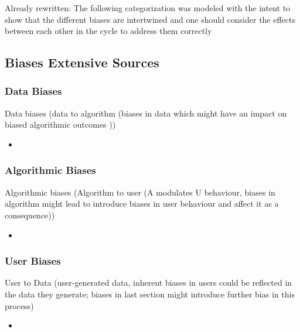 \documentclass[12pt, a4paper, oneside]{book}   	%
\renewcommand{\paragraph}[1]{%
	\subsubsection*{#1}%
}
\newif\ifrawcitationactive
\newcommand{\rawcitationstart}{
	\color{purple}\rawcitationactivetrue
}
\begin{document}
			Already rewritten: The following categorization was modeled with the intent to show that the different biases are intertwined and one should consider the effects between each other in the cycle to address them correctly \autocite{Mehrabi_2021}
		




			\rawcitationstart
			\subsection{Biases Extensive Sources}
			
			\paragraph{Data Biases}
			Data biases (data to algorithm (biases in data which might have an impact on biased algorithmic outcomes \autocite{Mehrabi_2021}))	
			\begin{itemize}
				\item 
			\end{itemize}	
			
			
			\paragraph{Algorithmic Biases}
			
			Algorithmic biases (Algorithm to user (A modulates U behaviour, biases in algorithm might lead to introduce biases in user behaviour and affect it as a consequence)) \autocite{Mehrabi_2021}
			\begin{itemize}
				\item 
			\end{itemize}
			
			\paragraph{User Biases}
			
			User to Data (user-generated data, inherent biases in users could be reflected in the data they generate; biases in last section might introduce further bias in this process) \autocite{Mehrabi_2021}
			\begin{itemize}
				\item
			\end{itemize}
		
\end{document}
